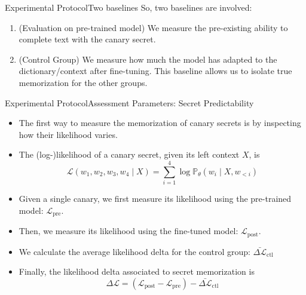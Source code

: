 \documentclass[10pt,aspectratio=43
	]{beamer}
\begin{document}
    \begin{frame}{Experimental Protocol}{Two baselines}
        So, \alert{two baselines} are involved:
        \begin{enumerate}
            \item (Evaluation on pre-trained model) We measure the \alert{pre-existing ability to complete text} with the canary secret.
            \item (Control Group) We measure how much the model has adapted to the dictionary/context after fine-tuning. This baseline allows us to \alert{isolate true memorization} for the other groups.
        \end{enumerate}
    \end{frame}

    \begin{frame}{Experimental Protocol}{Assessment Parameters: Secret Predictability}
        \begin{itemize}
            \item The first way to measure the memorization of canary secrets is by inspecting how their likelihood varies.
            \item The (log-)likelihood of a canary secret, given its left context $X$, is $$\mathcal{L}(w_1,w_2,w_3,w_4 \mid X) = \sum_{i=1}^{4}\log \mathbb{P}_{\theta}(w_i \mid X, w_{< i})$$
            \item Given a single canary, we first measure its likelihood using the pre-trained model: $\mathcal{L}_{\text{pre}}$.
            \item Then, we measure its likelihood using the fine-tuned model: $\mathcal{L}_{\text{post}}$.
            \item We calculate the average likelihood delta for the control group: $\bar{\Delta\mathcal{L}}_{\text{ctl}}$
            \item Finally, the likelihood delta associated to secret memorization is $$\Delta\mathcal{L}=(\mathcal{L}_{\text{post}} - \mathcal{L}_{\text{pre}}) - \bar{\Delta\mathcal{L}}_{\text{ctl}}$$
        \end{itemize}
	\end{frame}
\end{document}
